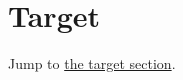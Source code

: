 \documentclass{article}
\begin{document}
\section{Target}\label{sec:target}
Jump to \hyperref[sec:target]{the target section}.
\end{document}
